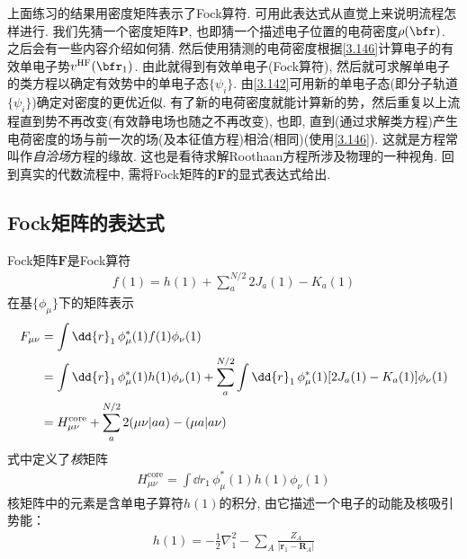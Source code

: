 上面练习的结果用密度矩阵表示了Fock算符. 
可用此表达式从直觉上来说明\hft 流程怎样进行. 
我们先猜一个密度矩阵$\mathbf{P}$, 
也即猜一个描述电子位置的电荷密度$\rho(\bfr)$. 
之后会有一些内容介绍如何猜. 
然后使用猜测的电荷密度根据\autoref{3.146}计算电子的有效单电子势$v^\mathrm{HF}(\bfr_1)$. 
由此就得到有效单电子\ha (Fock算符), 
然后就可求解单电子的类\sch 方程以确定有效势中的单电子态$\{\psi_i\}$. 
由\autoref{3.142}可用新的单电子态(即分子轨道$\{\psi_i\}$)确定对密度的更优近似. 
有了新的电荷密度就能计算新的\hft 势，然后重复以上流程直到\hft 势不再改变(有效静电场也随之不再改变), 
也即, 
直到(通过求解类\sch 方程)产生电荷密度的场与前一次的场(及\hft 本征值方程)相洽(相同)(使用\autoref{3.146}). 
这就是\hft 方程常叫作\emph{自洽场}方程的缘故. 
这也是看待求解Roothaan方程所涉及物理的一种视角. 
回到真实的代数流程中, 
需将Fock矩阵的$\mathbf{F}$的显式表达式给出.

\subsection{Fock矩阵的表达式}
Fock矩阵$\mathbf{F}$是Fock算符
\begin{align}
	f(1) = h(1) + \sum_{a}^{N/2}2J_a(1) -K_a(1)
\end{align}
在基$\{\phi_\mu\}$下的矩阵表示
\begin{align}
	\label{3.148}
	F_{\mu\nu} & = \int\dd{r}_1\,\phi_\mu^*(1)f(1)\phi_\nu(1)\notag\\
	& = \int\dd{r}_1\,\phi_\mu^*(1)h(1)\phi_\nu(1) + \sum_{a}^{N/2}\int\dd{r}_1\,\phi_\mu^*(1)[2J_a(1)-K_a(1)]\phi_\nu(1)\notag\\
	& = H_{\mu\nu}^\mathrm{core} + \sum_{a}^{N/2}2(\mu\nu|aa)-(\mu a|a\nu)
\end{align}
式中定义了\emph{核\ha}矩阵
\begin{align}
	H_{\mu\nu}^\mathrm{core} = \int\dd{r}_1\,\phi_\mu^*(1)h(1)\phi_\nu(1)
\end{align}
核\ha 矩阵中的元素是含单电子算符$h(1)$的积分, 
由它描述一个电子的动能及核吸引势能：
\begin{align}
	h(1) = -\frac{1}{2}\nabla_1^2 - \sum_A\frac{Z_A}{|\mathbf{r}_1-\mathbf{R}_A|}
\end{align}

